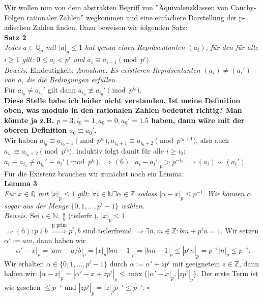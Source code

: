 \documentclass[12pt,ngerman]{scrartcl}
\begin{document}
Wir wollen nun von dem abstrakten Begriff von ''Äquivalenzklassen von Cauchy-Folgen rationaler Zahlen'' wegkommen und eine einfachere Darstellung der p-adischen Zahlen finden. Dazu beweisen wir folgenden Satz:\\[3 mm]
\textbf{Satz 2} \\
\textit{Jedes $a \in \mathbb{Q}_p$ mit $|a|_p \le 1$ hat genau einen Repräsentanten $(a_i)$, für den für alle $i \ge 1$ gilt: $0 \le a_i < p^i$ und $a_i \equiv a_{i+1} \pmod {p^i}$}. \\[1 mm]
\textit{Beweis.} Eindeutigkeit: \textit{Annahme: Es existieren Repräsentanten $(a_i)\neq (a_i')$ von a, die die Bedingungen erfüllen.}\\ Für $a_{i_0} \neq a_{i_0}'$ gilt dann $a_{i_0} \not\equiv a_{i_0}' \pmod{p^{i_0}}$. \\ \textbf{Diese Stelle habe ich leider nicht verstanden. Ist meine Definition oben, was modulo in den rationalen Zahlen bedeutet richtig? Man könnte ja z.B. $p=3,i_0=1,a_0=0,a_0'=1.5$ haben, dann wäre mit der oberen Definition $a_0 \equiv a_0'$.}\\ Wir haben $a_{i_0} \equiv a_{i_0+1} \pmod {p^{i_0}}, a_{i_0+1} \equiv a_{i_0+2} \pmod {p^{i_0+1}}$, also auch $a_{i_0} \equiv a_{i_0+2} \pmod {p^{i_0}}$, induktiv folgt damit für alle $i \ge i_0$: $a_i\equiv a_{i_0} \not\equiv a_{i_0}'\equiv a_i' \pmod{p^{i_0}}$. $\Rightarrow (6): |a_{i}-a_{i}'|_p > p^{-i_0}$ $\Rightarrow (a_i) \nsim (a_i')$ \lightning \\
Für die Existenz brauchen wir zunächst noch ein Lemma: \\[1 mm]
\textbf{Lemma 3} \\
\textit{Für $x \in \mathbb{Q}$ mit $|x|_p \le 1$ gilt: $\forall i \in \mathbb{N} \exists \alpha \in \mathbb{Z}$ sodass $|\alpha - x|_p \le p^{-i}$. Wir können $\alpha$ sogar aus der Menge $\{0,1, \ldots, p^i-1\}$ wählen.} \\
\textit{Beweis.} Sei $i \in \mathbb{N}$, $\frac{a}{b}$ (teilerfr.), $|x|_p \le 1$ \\
$\Rightarrow (6): p \nmid b$ $\overset{\text{p prim}}{\Rightarrow} p^i,b$ sind teilerfremd $\Rightarrow \exists n,m \in \mathbb{Z}: bm+p^in=1$. Wir setzen $\alpha':=am$, dann haben wir \[ |\alpha'-x|_p = |am-a/b|_p = |x|_p|bm-1|_p=|bm-1|_p\le|p^in|_p=p^{-i}|n|_p\le p^{-i}.\]
Wir erhalten $\alpha \in \{0,1, \ldots, p^i-1\}$ durch $\alpha:=\alpha'+zp^i$ mit geeignetem $z\in \mathbb{Z}$, dann haben wir: $|\alpha-x|_p=|\alpha'-x+zp^i|_p \le \max\{|\alpha'-x|_p,|zp^i|_p\}$. Der erste Term ist wie gesehen $\le p^{-i}$ und $|zp^i|_p=|z|_pp^{-i}\le p^{-i}$. \hfill $\square$\\
\end{document}
